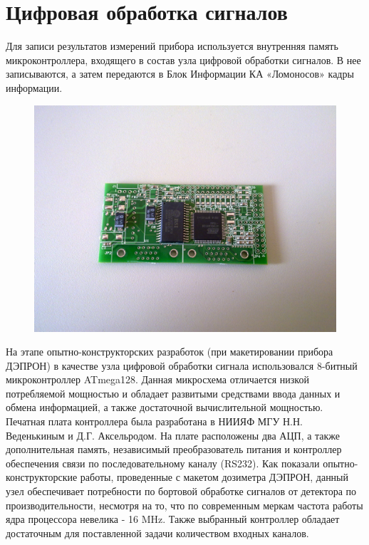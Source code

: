 \section{Цифровая обработка сигналов}

Для записи результатов измерений прибора используется внутренняя память микроконтроллера, входящего в состав узла цифровой обработки сигналов. В нее записываются, а затем передаются в Блок Информации КА «Ломоносов» кадры информации.
\begin{figure}
\centering
\includegraphics[width=0.7\linewidth]{images/04062010070.jpg}
\caption{}
\label{fig:04062010070}
\end{figure}

На этапе опытно-конструкторских разработок (при макетировании прибора ДЭПРОН) в качестве узла цифровой обработки сигнала использовался 8-битный микроконтроллер ATmega128. Данная микросхема отличается низкой потребляемой мощностью и обладает развитыми средствами ввода данных и обмена информацией, а также достаточной вычислительной мощностью. Печатная плата контроллера была разработана в  НИИЯФ МГУ Н.Н. Веденькиным и Д.Г. Аксельродом. На плате расположены два АЦП, а также дополнительная память, независимый преобразователь питания и контроллер обеспечения связи по последовательному каналу (RS232). Как показали опытно-конструкторские работы, проведенные с макетом дозиметра ДЭПРОН, данный узел обеспечивает потребности по бортовой обработке сигналов от детектора по производительности, несмотря на то, что по современным меркам частота работы ядра процессора невелика - 16 MHz. Также выбранный контроллер обладает достаточным для поставленной задачи количеством входных каналов.

